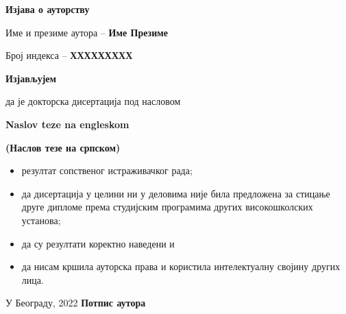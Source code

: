 
\cleardoublepage

\thispagestyle{empty}
\setlength{\parindent}{0pt}

\renewcommand{\headrulewidth}{0pt}


\normalsize

\mbox{}
\vspace{1cm}


\begin{center}
\begin{Large}\textbf{Изјава о ауторству}
\end{Large}\end{center}

\vspace{1.5cm}

Име и презиме аутора -- \textbf{Име Презиме}

Број индекса -- \textbf{ХХХХХХХХХ}

\vspace{.7cm}

\begin{center}
\textbf{Изјављујем}            \end{center}

да је докторска дисертација под насловом 


\textbf{ Naslov teze na engleskom}


\textbf{(Наслов тезе на српском)}

\begin{itemize}
 \item резултат сопственог истраживачког рада;
\item  да дисертација у целини 
ни у деловима није била предложена за стицање друге дипломе према студијским 
програмима других високошколских установа;
\item да су резултати коректно наведени и 
\item да нисам кршила ауторска права и користила интелектуалну својину 
других лица.
\end{itemize}

\vfill
 
У Београду, \hspace{1cm} 2022  \hfill  \textbf{Потпис
аутора\hspace{2cm}\mbox{}}

\vspace{.5cm}
\hspace{10cm}\hrulefill 

\hspace{\fill}
\pagebreak
\justify

